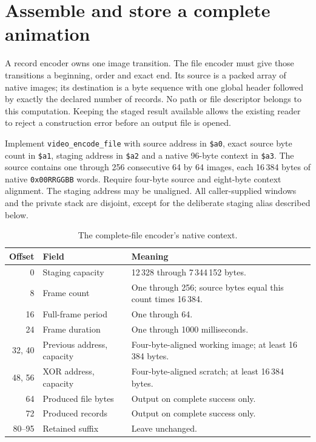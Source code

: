 \section{Assemble and store a complete animation}
A record encoder owns one image transition. The file encoder must give those
transitions a beginning, order and exact end. Its source is a packed array of
native images; its destination is a byte sequence with one global header followed
by exactly the declared number of records. No path or file descriptor belongs to
this computation. Keeping the staged result available allows the existing reader
to reject a construction error before an output file is opened.

Implement \texttt{video\_encode\_file} with source address in \texttt{\$a0}, exact
source byte count in \texttt{\$a1}, staging address in \texttt{\$a2} and a native
96-byte context in \texttt{\$a3}. The source contains one through 256 consecutive
64 by 64 images, each 16\,384 bytes of native \texttt{0x00RRGGBB} words. Require
four-byte source and eight-byte context alignment. The staging address may be
unaligned. All caller-supplied windows and the private stack are disjoint, except
for the deliberate staging alias described below.

\begin{table}[htbp]
  \centering
  \caption{The complete-file encoder's native context.}
  \label{tab:video-file-encode-context}
  \begin{tabular}{r p{1.5in} p{2.8in}}
    \toprule
    Offset & Field                      & Meaning                                                       \\
    \midrule
    0      & Staging capacity           & 12\,328 through 7\,344\,152 bytes.                            \\
    8      & Frame count                & One through 256; source bytes equal this count times 16\,384. \\
    16     & Full-frame period          & One through 64.                                               \\
    24     & Frame duration             & One through 1000 milliseconds.                                \\
    32, 40 & Previous address, capacity & Four-byte-aligned working image; at least 16\,384 bytes.      \\
    48, 56 & XOR address, capacity      & Four-byte-aligned scratch; at least 16\,384 bytes.            \\
    64     & Produced file bytes        & Output on complete success only.                              \\
    72     & Produced records           & Output on complete success only.                              \\
    80--95 & Retained suffix            & Leave unchanged.                                              \\
    \bottomrule
  \end{tabular}
\end{table}

